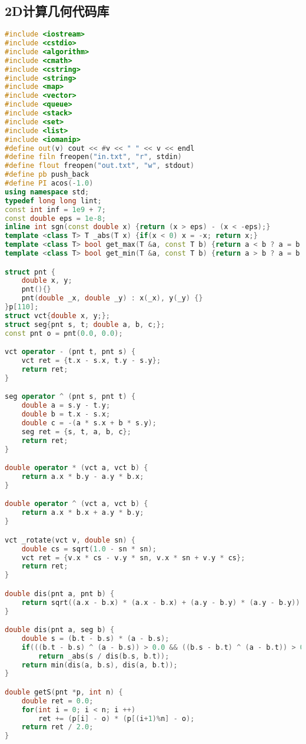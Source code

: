 \subsection{2D计算几何代码库}
    \begin{lstlisting}[language=c++]
#include <iostream>
#include <cstdio>
#include <algorithm>
#include <cmath>
#include <cstring>
#include <string>
#include <map>
#include <vector>
#include <queue>
#include <stack>
#include <set>
#include <list>
#include <iomanip>
#define out(v) cout << #v << " " << v << endl
#define filn freopen("in.txt", "r", stdin)
#define flout freopen("out.txt", "w", stdout)
#define pb push_back
#define PI acos(-1.0)
using namespace std;
typedef long long lint;
const int inf = 1e9 + 7;
const double eps = 1e-8;
inline int sgn(const double x) {return (x > eps) - (x < -eps);}
template <class T> T _abs(T x) {if(x < 0) x = -x; return x;}
template <class T> bool get_max(T &a, const T b) {return a < b ? a = b, true : false;}
template <class T> bool get_min(T &a, const T b) {return a > b ? a = b, true : false;}

struct pnt {
    double x, y;
    pnt(){}
    pnt(double _x, double _y) : x(_x), y(_y) {}
}p[110];
struct vct{double x, y;};
struct seg{pnt s, t; double a, b, c;};
const pnt o = pnt(0.0, 0.0);

vct operator - (pnt t, pnt s) {
    vct ret = {t.x - s.x, t.y - s.y};
    return ret;
}

seg operator ^ (pnt s, pnt t) {
    double a = s.y - t.y;
    double b = t.x - s.x;
    double c = -(a * s.x + b * s.y);
    seg ret = {s, t, a, b, c};
    return ret;
}

double operator * (vct a, vct b) {
    return a.x * b.y - a.y * b.x;
}

double operator ^ (vct a, vct b) {
    return a.x * b.x + a.y * b.y;
}

vct _rotate(vct v, double sn) {
    double cs = sqrt(1.0 - sn * sn);
    vct ret = {v.x * cs - v.y * sn, v.x * sn + v.y * cs};
    return ret;
}

double dis(pnt a, pnt b) {
    return sqrt((a.x - b.x) * (a.x - b.x) + (a.y - b.y) * (a.y - b.y));
}

double dis(pnt a, seg b) {
    double s = (b.t - b.s) * (a - b.s);
    if(((b.t - b.s) ^ (a - b.s)) > 0.0 && ((b.s - b.t) ^ (a - b.t)) > 0.0)
        return _abs(s / dis(b.s, b.t));
    return min(dis(a, b.s), dis(a, b.t));
}

double getS(pnt *p, int n) {
    double ret = 0.0;
    for(int i = 0; i < n; i ++)
        ret += (p[i] - o) * (p[(i+1)%n] - o);
    return ret / 2.0;
}


\end{lstlisting}

